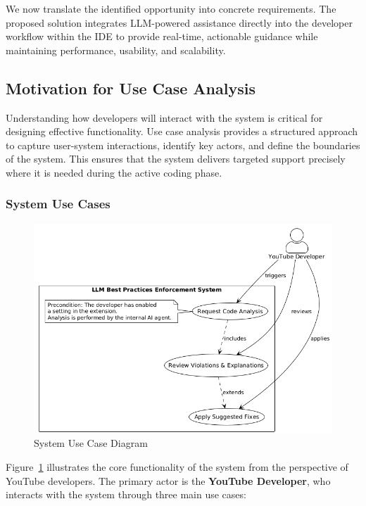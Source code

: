 \begin{spacing}{1.2}
We now translate the identified opportunity into concrete requirements. The proposed solution integrates LLM-powered assistance directly into the developer workflow within the IDE to provide real-time, actionable guidance while maintaining performance, usability, and scalability.

\subsection{Motivation for Use Case Analysis}

Understanding how developers will interact with the system is critical for designing effective functionality. Use case analysis provides a structured approach to capture user-system interactions, identify key actors, and define the boundaries of the system. This ensures that the system delivers targeted support precisely where it is needed during the active coding phase.

\subsubsection{System Use Cases}
\begin{figure}[H]
    \centering
    \includegraphics[scale=0.5]{images/use_case_diagram.png}
    \caption{System Use Case Diagram}
    \label{fig:use_case_diagram}
    \end{figure}

Figure~\ref{fig:use_case_diagram} illustrates the core functionality of the system from the perspective of YouTube developers. The primary actor is the \textbf{YouTube Developer}, who interacts with the system through three main use cases:


\end{spacing}
